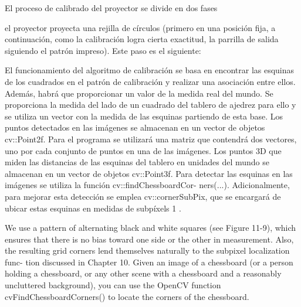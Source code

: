 El proceso de calibrado del proyector se divide en dos fases










el proyector proyecta una rejilla de círculos (primero en una posición fija, a continuación, como la calibración logra cierta exactitud, la parrilla de salida siguiendo el patrón impreso). Este paso es el siguiente: 

























El funcionamiento del algoritmo de calibración se basa en encontrar las esquinas de los
cuadrados en el patrón de calibración y realizar una asociación entre ellos. Además, habrá
que proporcionar un valor de la medida real del mundo. Se proporciona la medida del lado
de un cuadrado del tablero de ajedrez para ello y se utiliza un vector con la medida de las
esquinas partiendo de esta base.
Los puntos detectados en las imágenes se almacenan en un vector de objetos cv::Point2f.
Para el programa se utilizará una matriz que contendrá dos vectores, uno por cada conjunto
de puntos en una de las imágenes. Los puntos 3D que miden las distancias de las esquinas del
tablero en unidades del mundo se almacenan en un vector de objetos cv::Point3f.
Para detectar las esquinas en las imágenes se utiliza la función cv::findChessboardCor-
ners(...). Adicionalmente, para mejorar esta detección se emplea cv::cornerSubPix, que se
encargará de ubicar estas esquinas en medidas de subpíxels 1 .




We use a pattern of alternating black and white squares (see Figure 11-9),
which ensures that there is no bias toward one side or the other in measurement. Also,
the resulting grid corners lend themselves naturally to the subpixel localization func-
tion discussed in Chapter 10.
Given an image of a chessboard (or a person holding a chessboard, or any other scene
with a chessboard and a reasonably uncluttered background), you can use the OpenCV
function cvFindChessboardCorners() to locate the corners of the chessboard.



